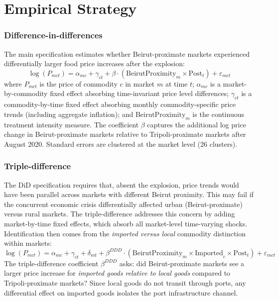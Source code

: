 \documentclass[12pt]{article}
\begin{document}


\section{Empirical Strategy}\label{sec:strategy}

\subsubsection*{Difference-in-differences} The main specification estimates whether Beirut-proximate markets experienced differentially larger food price increases after the explosion:
\begin{equation}\label{eq:did}
\log(P_{mct}) = \alpha_{mc} + \gamma_{ct} + \beta \cdot (\text{BeirutProximity}_m \times \text{Post}_t) + \varepsilon_{mct}
\end{equation}
where $P_{mct}$ is the price of commodity $c$ in market $m$ at time $t$; $\alpha_{mc}$ is a market-by-commodity fixed effect absorbing time-invariant price level differences; $\gamma_{ct}$ is a commodity-by-time fixed effect absorbing monthly commodity-specific price trends (including aggregate inflation); and $\text{BeirutProximity}_m$ is the continuous treatment intensity measure. The coefficient $\beta$ captures the additional log price change in Beirut-proximate markets relative to Tripoli-proximate markets after August 2020. Standard errors are clustered at the market level (26 clusters).

\subsubsection*{Triple-difference} The DiD specification requires that, absent the explosion, price trends would have been parallel across markets with different Beirut proximity. This may fail if the concurrent economic crisis differentially affected urban (Beirut-proximate) versus rural markets. The triple-difference addresses this concern by adding market-by-time fixed effects, which absorb all market-level time-varying shocks. Identification then comes from the \textit{imported versus local} commodity distinction within markets:
\begin{equation}\label{eq:ddd}
\log(P_{mct}) = \alpha_{mc} + \gamma_{ct} + \delta_{mt} + \beta^{DDD} \cdot (\text{BeirutProximity}_m \times \text{Imported}_c \times \text{Post}_t) + \varepsilon_{mct}
\end{equation}
The triple-difference coefficient $\beta^{DDD}$ asks: did Beirut-proximate markets see a larger price increase for \textit{imported goods relative to local goods} compared to Tripoli-proximate markets? Since local goods do not transit through ports, any differential effect on imported goods isolates the port infrastructure channel.
\end{document}
